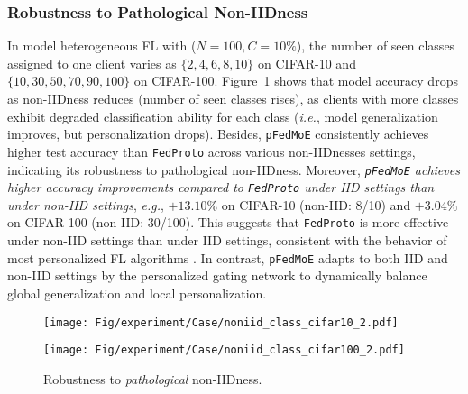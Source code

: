 \documentclass[sigconf]{acmart}
\newcommand{\hetero}{heterogeneous }
\newcommand{\pers}{personalized }
\newcommand{\persN}{personalization }
\newcommand{\genN}{generalization }
\newcommand{\methodname}{{\tt{pFedMoE}}}
\begin{document}
\subsubsection{Robustness to Pathological Non-IIDness}
In model \hetero FL with ($N=100, C=10\%$), the number of seen classes assigned to one client varies as $\{2, 4, 6, 8, 10\}$ on CIFAR-10 and $\{10, 30, 50, 70, 90, 100\}$ on CIFAR-100. 
Figure~\ref{fig:case-noniid-class} shows that model accuracy drops as non-IIDness reduces (number of seen classes rises), as clients with more classes exhibit degraded classification ability for each class (\emph{i.e.}, model \genN improves, but \persN drops). 
Besides, \methodname{} consistently achieves higher test accuracy than {\tt{FedProto}} across various non-IIDnesses settings, indicating its robustness to pathological non-IIDness. 
Moreover, \textit{\methodname{} achieves higher accuracy improvements compared to {\tt{FedProto}} under IID settings than under non-IID settings}, \emph{e.g.}, $+13.10\%$ on CIFAR-10 (non-IID: 8/10) and $+3.04\%$ on CIFAR-100 (non-IID: 30/100). This suggests that {\tt{FedProto}} is more effective under non-IID settings than under IID settings, consistent with the behavior of most \pers FL algorithms \citep{FedAPEN}. In contrast, \methodname{} adapts to both IID and non-IID settings by the \pers gating network to dynamically balance global \genN and local personalization.


\begin{figure}[t]
\centering
\begin{minipage}[t]{0.5\linewidth}
\centering
\texttt{[image: Fig/experiment/Case/noniid\_class\_cifar10\_2.pdf]}
\end{minipage}%
\begin{minipage}[t]{0.5\linewidth}
\centering
\texttt{[image: Fig/experiment/Case/noniid\_class\_cifar100\_2.pdf]}
\end{minipage}%
\vspace{-1em}
\caption{Robustness to \textit{pathological} non-IIDness.}
\label{fig:case-noniid-class}
\vspace{-1em}
\end{figure}
\end{document}
